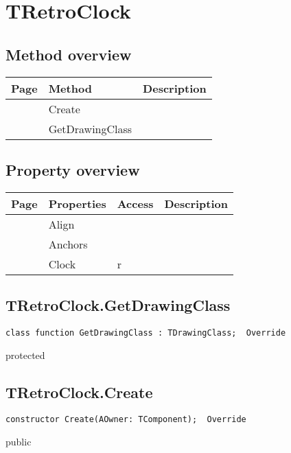 \section{TRetroClock}
\label{hmi:retroclock:tretroclock}
\subsection{Method overview}
\label{hmi:retroclock:tretroclock:methods}
\begin{tabularx}{\textwidth}{llX}
Page & Method & Description  \\ \hline
\pageref{hmi:retroclock:tretroclock:create} & Create  &  \\
\pageref{hmi:retroclock:tretroclock:getdrawingclass} & GetDrawingClass  &  \\
\hline
\end{tabularx}
\subsection{Property overview}
\label{hmi:retroclock:tretroclock:properties}
\begin{tabularx}{\textwidth}{lllX}
Page & Properties & Access & Description \\ \hline
\pageref{hmi:retroclock:tretroclock:align} & Align &  &  \\
\pageref{hmi:retroclock:tretroclock:anchors} & Anchors &  &  \\
\pageref{hmi:retroclock:tretroclock:clock} & Clock & r &  \\
\hline
\end{tabularx}
\subsection{TRetroClock.GetDrawingClass}
\label{hmi:retroclock:tretroclock:getdrawingclass}
\begin{FPCList}
\Declaration 

\begin{verbatim}
class function GetDrawingClass : TDrawingClass;  Override
\end{verbatim}
\Visibility
protected
\end{FPCList}
\subsection{TRetroClock.Create}
\label{hmi:retroclock:tretroclock:create}
\begin{FPCList}
\Declaration 

\begin{verbatim}
constructor Create(AOwner: TComponent);  Override
\end{verbatim}
\Visibility
public
\end{FPCList}
